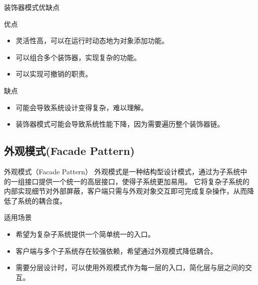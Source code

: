 \documentclass[UTF8,aspectratio=169]{beamer}
\begin{document}
\begin{frame}{装饰器模式优缺点}
    \begin{ytublock}{优点}
        \begin{itemize}
            \item 灵活性高，可以在运行时动态地为对象添加功能。
            \item 可以组合多个装饰器，实现复杂的功能。
            \item 可以实现可撤销的职责。
        \end{itemize}
    \end{ytublock}
    \begin{alertytublock}{缺点}
        \begin{itemize}
            \item 可能会导致系统设计变得复杂，难以理解。
            \item 装饰器模式可能会导致系统性能下降，因为需要遍历整个装饰器链。
        \end{itemize}
    \end{alertytublock}
\end{frame}

\subsection{外观模式(Facade Pattern)}

\begin{frame}{外观模式（Facade Pattern）}
    外观模式是一种结构型设计模式，通过为子系统中的一组接口提供一个统一的高层接口，使得子系统更加易用。
    它将复杂子系统的内部实现细节对外部屏蔽，客户端只需与外观对象交互即可完成复杂操作，从而降低了系统的耦合度。

    \begin{ytublock}{适用场景}
        \begin{itemize}
            \item 希望为复杂子系统提供一个简单统一的入口。
            \item 客户端与多个子系统存在较强依赖，希望通过外观模式降低耦合。
            \item 需要分层设计时，可以使用外观模式作为每一层的入口，简化层与层之间的交互。
        \end{itemize}
    \end{ytublock}
\end{frame}
\end{document}
